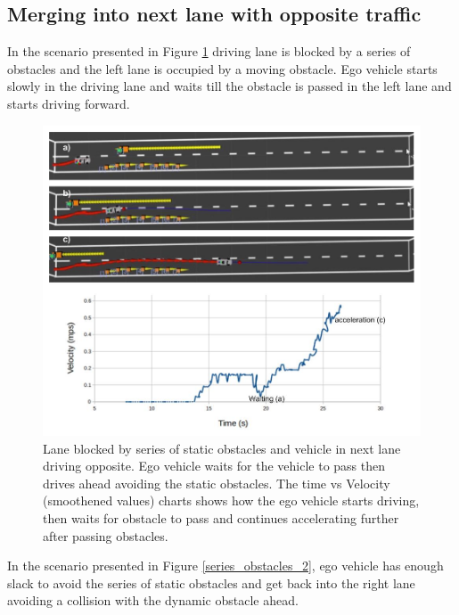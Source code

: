 \fi

\subsection{Merging into next lane with opposite traffic}

In the scenario presented in Figure \ref{series_obstacles} driving lane is blocked by a series of obstacles and the left lane is occupied by a moving obstacle. Ego vehicle starts slowly in the driving lane and waits till the obstacle is passed in the left lane and starts driving forward. 
\begin{figure}
    \centering
    \includegraphics[width=1.0\textwidth]{Images/evaluation/vehicle_opp_1.jpg}
    \caption{Lane blocked by series of static obstacles and vehicle in next lane driving opposite. Ego vehicle waits for the vehicle to pass then drives ahead avoiding the static obstacles. The time vs Velocity (smoothened values) charts shows how the ego vehicle starts driving, then waits for obstacle to pass and continues accelerating further after passing obstacles.}
    \label{series_obstacles}
\end{figure}

In the scenario presented in Figure \ref{series_obstacles_2}, ego vehicle has enough slack to avoid the series of static obstacles and get back into the right lane avoiding a collision with the dynamic obstacle ahead. 

